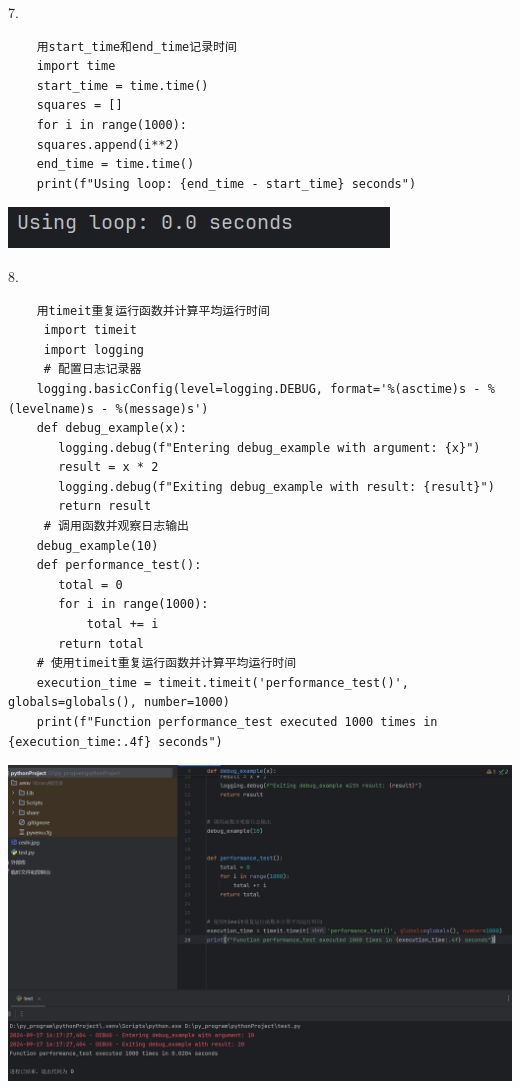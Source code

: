 \documentclass{article}
\begin{document}
7.
\begin{verbatim}
	用start_time和end_time记录时间
	import time
	start_time = time.time()
	squares = []
	for i in range(1000):
	squares.append(i**2)
	end_time = time.time()
	print(f"Using loop: {end_time - start_time} seconds")       
\end{verbatim}

\noindent
\begin{minipage}{\linewidth}
	\centering
	\includegraphics[width=0.5\linewidth]{time.png}
	\label{fig:example}
\end{minipage}


8.
\begin{verbatim}
	用timeit重复运行函数并计算平均运行时间
     import timeit
     import logging
     # 配置日志记录器
    logging.basicConfig(level=logging.DEBUG, format='%(asctime)s - %(levelname)s - %(message)s')
    def debug_example(x):
       logging.debug(f"Entering debug_example with argument: {x}")
       result = x * 2
       logging.debug(f"Exiting debug_example with result: {result}")
       return result
     # 调用函数并观察日志输出
    debug_example(10)
    def performance_test():
       total = 0
       for i in range(1000):
           total += i
       return total
    # 使用timeit重复运行函数并计算平均运行时间
    execution_time = timeit.timeit('performance_test()', globals=globals(), number=1000)
    print(f"Function performance_test executed 1000 times in {execution_time:.4f} seconds")
\end{verbatim}



\noindent
\begin{minipage}{\linewidth}
 \centering
  \includegraphics[width=0.5\linewidth]{timeit.png}
  \label{fig:example}
\end{minipage}
\end{document}
